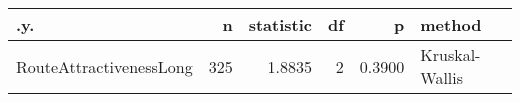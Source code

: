 \begin{tabular}{lrrrrl}
  \hline
.y. & n & statistic & df & p & method \\ 
  \hline
RouteAttractivenessLong &   325 & 1.8835 &     2 & 0.3900 & Kruskal-Wallis \\ 
   \hline
\end{tabular}
